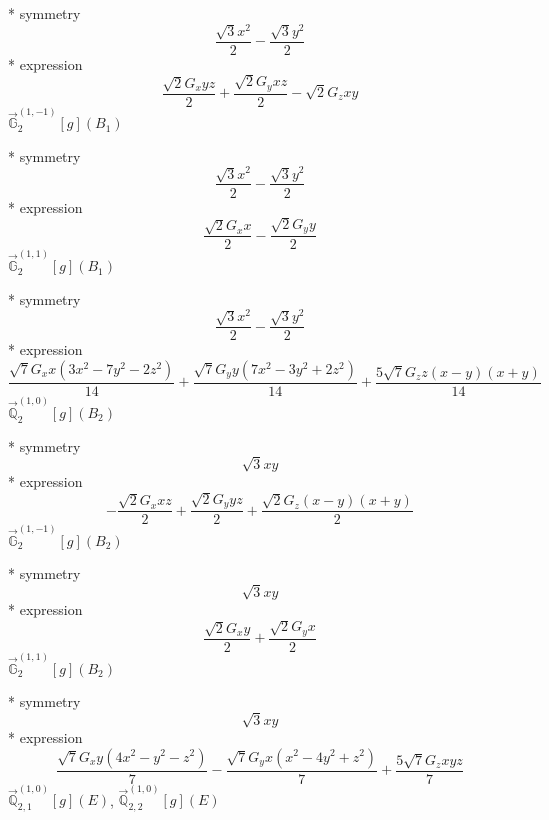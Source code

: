 \documentclass[fleqn,8pt]{jsarticle}
\begin{document}
\noindent\quad ** symmetry
\begin{dmath*}
\frac{\sqrt{3} x^{2}}{2} - \frac{\sqrt{3} y^{2}}{2}
\end{dmath*}
\noindent\quad ** expression
\begin{dmath*}
\frac{\sqrt{2} G_{x} y z}{2} + \frac{\sqrt{2} G_{y} x z}{2} - \sqrt{2} G_{z} x y
\end{dmath*}
\noindent\quad $\vec{\mathbb{G}}_{2}^{(1,-1)}[g](B_{1})$

\noindent\quad ** symmetry
\begin{dmath*}
\frac{\sqrt{3} x^{2}}{2} - \frac{\sqrt{3} y^{2}}{2}
\end{dmath*}
\noindent\quad ** expression
\begin{dmath*}
\frac{\sqrt{2} G_{x} x}{2} - \frac{\sqrt{2} G_{y} y}{2}
\end{dmath*}
\noindent\quad $\vec{\mathbb{G}}_{2}^{(1,1)}[g](B_{1})$

\noindent\quad ** symmetry
\begin{dmath*}
\frac{\sqrt{3} x^{2}}{2} - \frac{\sqrt{3} y^{2}}{2}
\end{dmath*}
\noindent\quad ** expression
\begin{dmath*}
\frac{\sqrt{7} G_{x} x \left(3 x^{2} - 7 y^{2} - 2 z^{2}\right)}{14} + \frac{\sqrt{7} G_{y} y \left(7 x^{2} - 3 y^{2} + 2 z^{2}\right)}{14} + \frac{5 \sqrt{7} G_{z} z \left(x - y\right) \left(x + y\right)}{14}
\end{dmath*}
\noindent\quad $\vec{\mathbb{Q}}_{2}^{(1,0)}[g](B_{2})$

\noindent\quad ** symmetry
\begin{dmath*}
\sqrt{3} x y
\end{dmath*}
\noindent\quad ** expression
\begin{dmath*}
- \frac{\sqrt{2} G_{x} x z}{2} + \frac{\sqrt{2} G_{y} y z}{2} + \frac{\sqrt{2} G_{z} \left(x - y\right) \left(x + y\right)}{2}
\end{dmath*}
\noindent\quad $\vec{\mathbb{G}}_{2}^{(1,-1)}[g](B_{2})$

\noindent\quad ** symmetry
\begin{dmath*}
\sqrt{3} x y
\end{dmath*}
\noindent\quad ** expression
\begin{dmath*}
\frac{\sqrt{2} G_{x} y}{2} + \frac{\sqrt{2} G_{y} x}{2}
\end{dmath*}
\noindent\quad $\vec{\mathbb{G}}_{2}^{(1,1)}[g](B_{2})$

\noindent\quad ** symmetry
\begin{dmath*}
\sqrt{3} x y
\end{dmath*}
\noindent\quad ** expression
\begin{dmath*}
\frac{\sqrt{7} G_{x} y \left(4 x^{2} - y^{2} - z^{2}\right)}{7} - \frac{\sqrt{7} G_{y} x \left(x^{2} - 4 y^{2} + z^{2}\right)}{7} + \frac{5 \sqrt{7} G_{z} x y z}{7}
\end{dmath*}
\noindent\quad $\vec{\mathbb{Q}}_{2,1}^{(1,0)}[g](E)$, $\vec{\mathbb{Q}}_{2,2}^{(1,0)}[g](E)$
\end{document}
